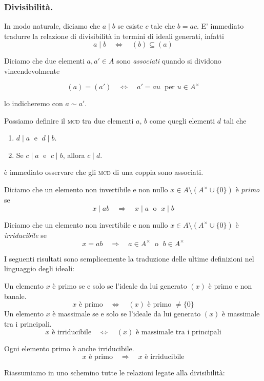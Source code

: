 \begin{multicols}{2}
\columnbreak
\subsubsection{Divisibilità.}
In modo naturale, diciamo che $ a \mid b $ se esiste $ c  $ tale che $ b = ac $. E' immediato tradurre la relazione di divisibilità in termini di ideali generati, infatti 
\[ a \mid b \quad\Leftrightarrow\quad (b) \subseteq (a) \]

\begin{definition}
	Diciamo che due elementi $ a, a' \in A $ sono \emph{associati} quando si dividono vincendevolmente

\[ (a) = (a') \quad\Leftrightarrow\quad a' = au \;\text{ per } u \in A^\times \]

lo indicheremo con $ a \sim a' $.
\end{definition}

Possiamo definire  il \textsc{mcd} tra due elementi $ a,\, b $ come quegli elementi $ d $ tali che
\begin{enumerate}
	\item $ d \mid a \;$   e   $\; d \mid b $.
	\item Se $ c \mid a\; $ e $ \; c \mid b $, allora $ c \mid d $.
\end{enumerate}
è immediato osservare che gli \textsc{mcd} di una coppia sono associati.

\begin{definition}[Primo]
	Diciamo che un elemento non invertibile e non nullo $ x \in A\setminus(A^\times \cup \{0\}) $ è \emph{primo} se \[ x \mid ab \quad\Rightarrow\quad x \mid a \; \text{ o }\; x \mid b \]
\end{definition}

\begin{definition}[Irriducibile]
	Diciamo che un elemento non invertibile e non nullo $ x \in A\setminus(A^\times \cup \{0\}) $ è \emph{irriducibile} se \[ x = ab \quad\Rightarrow\quad a\in A^\times \; \text{ o }\; b \in A^\times \]
\end{definition}

I seguenti risultati sono semplicemente la traduzione delle ultime definizioni nel linguaggio degli ideali:

\begin{theorem}\label{prpr}\label{mama}
	Un elemento $ x $ è primo se e solo se l'ideale da lui generato $ (x) $ è primo e non banale.
	\[ x \text{ è primo} \quad\Leftrightarrow\quad (x) \text{ è primo } \neq \{0\}  \]
	Un elemento $ x $ è massimale se e solo se l'ideale da lui generato $ (x) $ è massimale tra i principali.
	\[ x \text{ è irriducibile} \quad\Leftrightarrow\quad (x) \text{ è massimale tra i principali} \]
\end{theorem}

\begin{theorem}\label{epei}
	Ogni elemento primo è anche irriducibile.
	\[ x \text{ è primo} \quad\Rightarrow\quad x \text{ è irriducibile} \]
\end{theorem}
Riassumiamo in uno schemino tutte le relazioni legate alla divisibilità:
\end{multicols}
